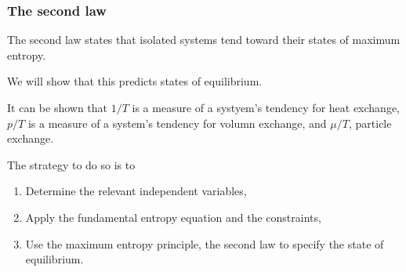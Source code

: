 \subsubsection{The second law}
\begin{post}
The second law states that isolated systems tend toward their states of maximum entropy. 
\end{post}
We will show that this predicts states of equilibrium. 
\begin{thrm}
It can be shown that $1/T$ is a measure of a systyem's tendency for heat exchange, 
$p/T$ is a measure of a system's tendency for volumn exchange, 
and $\mu/T$, particle exchange.
\end{thrm}
The strategy to do so is to
\begin{enumerate}
\item Determine the relevant independent variables, 
\item Apply the fundamental entropy equation and the constraints, 
\item Use the maximum entropy principle, \ie the second law to specify the state of equilibrium. 
\end{enumerate}
